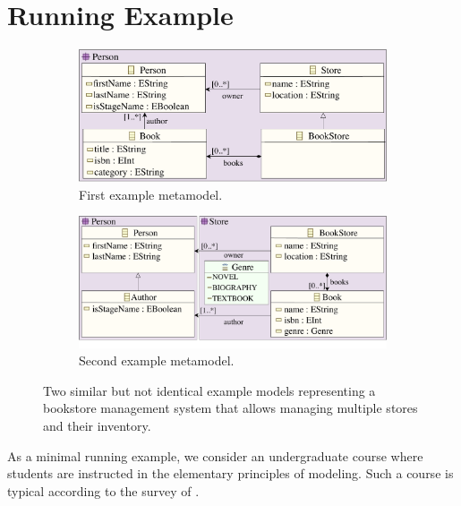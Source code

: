 \section{Running Example}
\label{sec:mde-example}

\begin{figure}[b]
    \centering
    \begin{subfigure}{.96\textwidth}
        \centering\captionsetup{width=.95\linewidth}%
        \caption{First example metamodel.}
        \label{fig:sub1}
        \includegraphics[width=.8\textwidth]{figures/mde/bookstore-1.drawio.pdf}
    \end{subfigure}  
    
    \begin{subfigure}{.96\textwidth}
          \centering\captionsetup{width=.95\linewidth}%
        \caption{Second example metamodel.}
          \label{fig:sub2}
          \includegraphics[width=.8\textwidth]{figures/mde/bookstore-2.drawio.pdf}
    \end{subfigure}
    \caption[Running Example: Bookstore Models]{Two similar but not identical example models representing a bookstore management system that allows managing multiple stores and their inventory.}
    \label{fig:running-example}
\end{figure}
%
\noindent
As a minimal running example, we consider an undergraduate course where students are instructed in the elementary principles of modeling. Such a course is typical according to the survey of \citet{Ciccozzi2018}.
